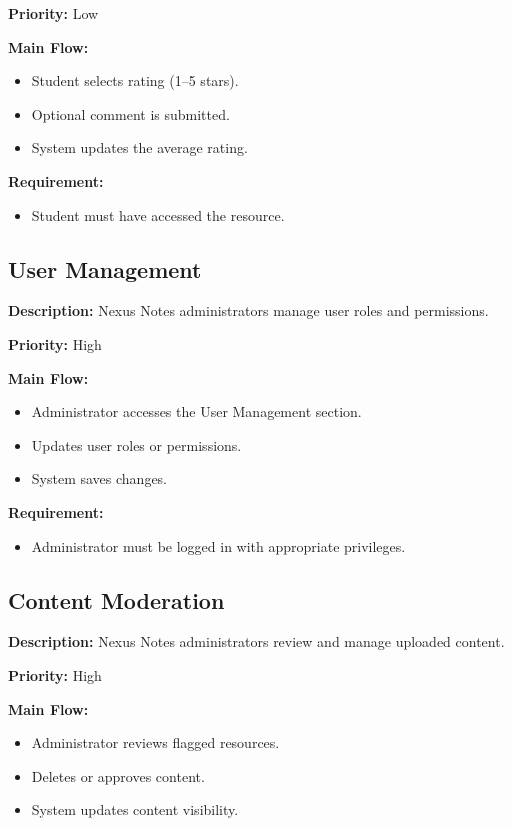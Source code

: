 \documentclass[12pt]{article}
\begin{document}
\textbf{Priority:} Low

\textbf{Main Flow:}
\begin{itemize}
    \item Student selects rating (1--5 stars).
    \item Optional comment is submitted.
    \item System updates the average rating.
\end{itemize}

\textbf{Requirement:}
\begin{itemize}
    \item Student must have accessed the resource.
\end{itemize}


\subsection{User Management}

\textbf{Description:} Nexus Notes administrators manage user roles and permissions.

\textbf{Priority:} High

\textbf{Main Flow:}
\begin{itemize}
    \item Administrator accesses the User Management section.
    \item Updates user roles or permissions.
    \item System saves changes.
\end{itemize}

\textbf{Requirement:}
\begin{itemize}
    \item Administrator must be logged in with appropriate privileges.
\end{itemize}


\subsection{Content Moderation}

\textbf{Description:} Nexus Notes administrators review and manage uploaded content.

\textbf{Priority:} High

\textbf{Main Flow:}
\begin{itemize}
    \item Administrator reviews flagged resources.
    \item Deletes or approves content.
    \item System updates content visibility.
\end{itemize}
\end{document}
